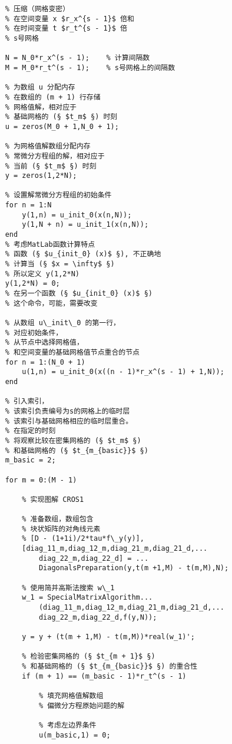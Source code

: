 \documentclass[twoside]{book}
\begin{document}
\begin{CJK*}{GBK}{song}
\begin{lstlisting}
    % 压缩（网格变密）
    % 在空间变量 x $r_x^{s - 1}$ 倍和
    % 在时间变量 t $r_t^{s - 1}$ 倍
    % s号网格

    N = N_0*r_x^(s - 1);    % 计算间隔数
    M = M_0*r_t^(s - 1);    % s号网格上的间隔数

    % 为数组 u 分配内存
    % 在数组的 (m + 1) 行存储
    % 网格值解，相对应于
    % 基础网格的 (§ $t_m$ §) 时刻
    u = zeros(M_0 + 1,N_0 + 1);

    % 为网格值解数组分配内存
    % 常微分方程组的解，相对应于
    % 当前 (§ $t_m$ §) 时刻
    y = zeros(1,2*N);

    % 设置解常微分方程组的初始条件
    for n = 1:N
        y(1,n) = u_init_0(x(n,N));
        y(1,N + n) = u_init_1(x(n,N));
    end
    % 考虑MatLab函数计算特点
    % 函数 (§ $u_{init_0} (x)$ §), 不正确地
    % 计算当 (§ $x = \infty$ §)
    % 所以定义 y(1,2*N)
    y(1,2*N) = 0;
    % 在另一个函数 (§ $u_{init_0} (x)$ §)
    % 这个命令，可能，需要改变

    % 从数组 u\_init\_0 的第一行，
    % 对应初始条件，
    % 从节点中选择网格值，
    % 和空间变量的基础网格值节点重合的节点
    for n = 1:(N_0 + 1)
        u(1,n) = u_init_0(x((n - 1)*r_x^(s - 1) + 1,N));
    end

    % 引入索引，
    % 该索引负责编号为s的网格上的临时层
    % 该索引与基础网格相应的临时层重合。
    % 在指定的时刻
    % 将观察比较在密集网格的 (§ $t_m$ §)
    % 和基础网格的 (§ $t_{m_{basic}}$ §)
    m_basic = 2;

    for m = 0:(M - 1)

        % 实现图解 CROS1

        % 准备数组，数组包含
        % 块状矩阵的对角线元素
        % [D - (1+1i)/2*tau*f\_y(y)],
        [diag_11_m,diag_12_m,diag_21_m,diag_21_d,...
            diag_22_m,diag_22_d] = ...
            DiagonalsPreparation(y,t(m +1,M) - t(m,M),N);

        % 使用简并高斯法搜索 w\_1
        w_1 = SpecialMatrixAlgorithm...
            (diag_11_m,diag_12_m,diag_21_m,diag_21_d,...
            diag_22_m,diag_22_d,f(y,N));

        y = y + (t(m + 1,M) - t(m,M))*real(w_1)';

        % 检验密集网格的 (§ $t_{m + 1}$ §)
        % 和基础网格的 (§ $t_{m_{basic}}$ §) 的重合性
        if (m + 1) == (m_basic - 1)*r_t^(s - 1)

            % 填充网格值解数组
            % 偏微分方程原始问题的解

            % 考虑左边界条件
            u(m_basic,1) = 0;


\end{lstlisting}
\end{CJK*}
\end{document}

